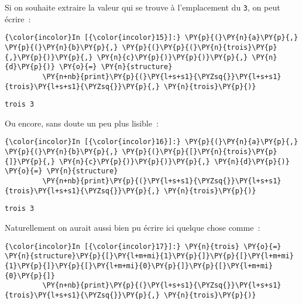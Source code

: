     Si on souhaite extraire la valeur qui se trouve à l'emplacement du
\texttt{3}, on peut écrire~:

    \begin{Verbatim}[commandchars=\\\{\},frame=single,framerule=0.3mm,rulecolor=\color{cellframecolor}]
{\color{incolor}In [{\color{incolor}15}]:} \PY{p}{(}\PY{n}{a}\PY{p}{,} \PY{p}{(}\PY{n}{b}\PY{p}{,} \PY{p}{(}\PY{p}{(}\PY{n}{trois}\PY{p}{,}\PY{p}{)}\PY{p}{,} \PY{n}{c}\PY{p}{)}\PY{p}{)}\PY{p}{,} \PY{n}{d}\PY{p}{)} \PY{o}{=} \PY{n}{structure}
         \PY{n+nb}{print}\PY{p}{(}\PY{l+s+s1}{\PYZsq{}}\PY{l+s+s1}{trois}\PY{l+s+s1}{\PYZsq{}}\PY{p}{,} \PY{n}{trois}\PY{p}{)}
\end{Verbatim}


    \begin{Verbatim}[commandchars=\\\{\},frame=single,framerule=0.3mm,rulecolor=\color{cellframecolor}]
trois 3
\end{Verbatim}

    Ou encore, sans doute un peu plus lisible~:

    \begin{Verbatim}[commandchars=\\\{\},frame=single,framerule=0.3mm,rulecolor=\color{cellframecolor}]
{\color{incolor}In [{\color{incolor}16}]:} \PY{p}{(}\PY{n}{a}\PY{p}{,} \PY{p}{(}\PY{n}{b}\PY{p}{,} \PY{p}{(}\PY{p}{[}\PY{n}{trois}\PY{p}{]}\PY{p}{,} \PY{n}{c}\PY{p}{)}\PY{p}{)}\PY{p}{,} \PY{n}{d}\PY{p}{)} \PY{o}{=} \PY{n}{structure}
         \PY{n+nb}{print}\PY{p}{(}\PY{l+s+s1}{\PYZsq{}}\PY{l+s+s1}{trois}\PY{l+s+s1}{\PYZsq{}}\PY{p}{,} \PY{n}{trois}\PY{p}{)}
\end{Verbatim}


    \begin{Verbatim}[commandchars=\\\{\},frame=single,framerule=0.3mm,rulecolor=\color{cellframecolor}]
trois 3
\end{Verbatim}

    Naturellement on aurait aussi bien pu écrire ici quelque chose comme~:

    \begin{Verbatim}[commandchars=\\\{\},frame=single,framerule=0.3mm,rulecolor=\color{cellframecolor}]
{\color{incolor}In [{\color{incolor}17}]:} \PY{n}{trois} \PY{o}{=} \PY{n}{structure}\PY{p}{[}\PY{l+m+mi}{1}\PY{p}{]}\PY{p}{[}\PY{l+m+mi}{1}\PY{p}{]}\PY{p}{[}\PY{l+m+mi}{0}\PY{p}{]}\PY{p}{[}\PY{l+m+mi}{0}\PY{p}{]}
         \PY{n+nb}{print}\PY{p}{(}\PY{l+s+s1}{\PYZsq{}}\PY{l+s+s1}{trois}\PY{l+s+s1}{\PYZsq{}}\PY{p}{,} \PY{n}{trois}\PY{p}{)}
\end{Verbatim}


